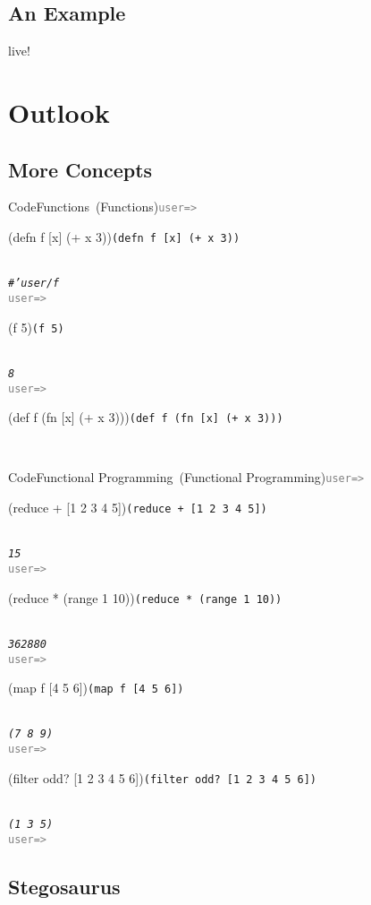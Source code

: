 \documentclass{beamer}
\newenvironment{code}[1]{\begin{block}{Code\ifx#1\empty\else~(#1)\fi}\prompt}{\end{block}}
\newcommand{\prompt}{\texttt{\textcolor{gray}{user=>}}}
\newcommand{\codeinput}[1]{\parbox[t]{0.8\linewidth}{\ifx#1\empty\else\lstinline{#1}\fi}\\}
\newcommand{\codeoutput}[1]{\textit{\texttt{#1}}\\\prompt}
\newcommand{\codeio}[2]{\onslide<+->\codeinput{#1}\onslide<+->\codeoutput{#2}}
\begin{document}
\subsection{An Example}

\begin{frame}
  \onslide<+->
  \begin{Example}
    \onslide<+->
    live!
  \end{Example}
\end{frame}

\section{Outlook}

\subsection{More Concepts}

\begin{frame}
  \onslide<+->
  \begin{code}{Functions}
    \codeio{(defn f [x] (+ x 3))}{\#'user/f}
    \codeio{(f 5)}{8}
    \onslide<+->
    \codeinput{(def f (fn [x] (+ x 3)))}
  \end{code}
  \onslide<+->
  \begin{code}{Functional Programming}
    \codeio{(reduce + [1 2 3 4 5])}{15}
    \codeio{(reduce * (range 1 10))}{362880}
    \codeio{(map f [4 5 6])}{(7 8 9)}
    \codeio{(filter odd? [1 2 3 4 5 6])}{(1 3 5)}
  \end{code}
\end{frame}

\subsection{Stegosaurus}
\end{document}
